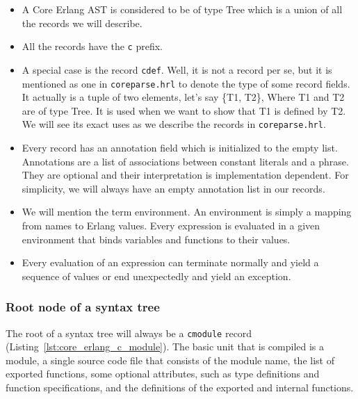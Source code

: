 \begin{itemize}
  \item A Core Erlang AST is considered to be of type Tree which is a union of
    all the records we will describe.
  \item All the records have the \texttt{c\textunderscore} prefix.
  \item A special case is the record \texttt{c\textunderscore def}. Well, it is not a record per se,
    but it is mentioned as one in \texttt{core\textunderscore parse.hrl} to denote the type of some
    record fields. It actually is a tuple of two elements, let’s say \{T1, T2\},
    Where T1 and T2 are of type Tree. It is used when we want to show that T1
    is defined by T2. We will see its exact uses as we describe the records in
    \texttt{core\textunderscore parse.hrl}.
  \item Every record has an annotation field which is initialized to the empty
    list. Annotations are a list of associations between constant literals and
    a phrase. They are optional and their interpretation is implementation
    dependent. For simplicity, we will always have an empty annotation list in
    our records.
  \item We will mention the term environment. An environment is simply a
    mapping from names to Erlang values. Every expression is evaluated in a
    given environment that binds variables and functions to their values.
  \item Every evaluation of an expression can terminate normally and yield a
    sequence of values or end unexpectedly and yield an exception.
\end{itemize}

\subsubsection{Root node of a syntax tree}


The root of a syntax tree will always be a \texttt{c\textunderscore module} record (Listing~\ref{lst:core_erlang_c_module}). The basic unit that
is compiled is a module, a single source code file that consists of the module
name, the list of exported functions, some optional attributes, such as type
definitions and function specifications, and the definitions of the exported
and internal functions. 

